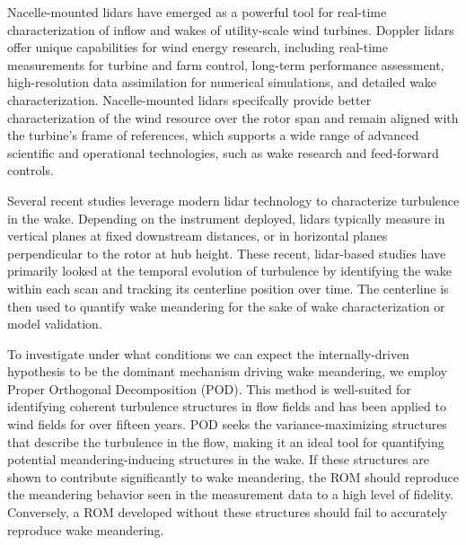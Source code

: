 \documentclass[%
 aip,
 amsmath,
 amssymb,
]{revtex4-2}
\begin{document}
Nacelle-mounted lidars have emerged as a powerful tool for real-time characterization of inflow and wakes of utility-scale wind turbines.\cite{letizia2023characterization} 
Doppler lidars offer unique capabilities for wind energy research, including real-time measurements for turbine and farm control, long-term performance assessment, high-resolution data assimilation for numerical simulations, and detailed wake characterization.\cite{trujillo_light_2011, kumer2015characterisation, bodini2017three, zhan2020lidar, iungo2013field,iungo2014volumetric, doubrawa2020multimodel, letizia2021lisboa} 
Nacelle-mounted lidars specifcally provide better characterization of the wind resource over the rotor span and remain aligned with the turbine's frame of references, which supports a wide range of advanced scientific and operational technologies, such as wake research and feed-forward controls.

Several recent studies leverage modern lidar technology to characterize turbulence in the wake. 
Depending on the instrument deployed, lidars typically measure in vertical planes at fixed downstream distances,\cite{conti_wind_2020, doubrawa2020multimodel, conti_calibration_2021} or in horizontal planes perpendicular to the rotor at hub height.\cite{reinwardt_dynamic_2020, reinwardt_validation_2021}
These recent, lidar-based studies have primarily looked at the temporal evolution of turbulence by identifying the wake within each scan and tracking its centerline position over time. 
The centerline is then used to quantify wake meandering for the sake of wake characterization \cite{conti_wind_2020} or model validation.\cite{doubrawa2020multimodel}

To investigate under what conditions we can expect the internally-driven hypothesis to be the dominant mechanism driving wake meandering, we employ Proper Orthogonal Decomposition (POD). 
This method is well-suited for identifying coherent turbulence structures in flow fields \cite{berkooz_proper_1993} and has been applied to wind fields for over fifteen years.\cite{spitler_initial_2004, saranyasoontorn_low-dimensional_2005, hamilton2015wind, hamilton2016low, verhulst_large_2014}
POD seeks the variance-maximizing structures that describe the turbulence in the flow, making it an ideal tool for quantifying potential meandering-inducing structures in the wake.
If these structures are shown to contribute significantly to wake meandering, the ROM should reproduce the meandering behavior seen in the measurement data to a high level of fidelity. 
Conversely, a ROM developed without these structures should fail to accurately reproduce wake meandering.
\end{document}
